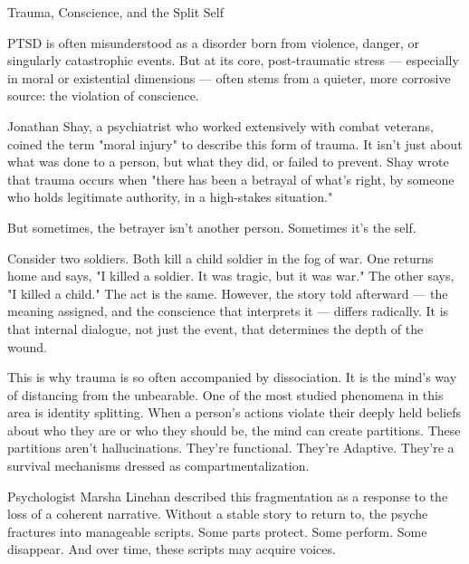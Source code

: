 \medskip

\begin{PsychologicalSidebar}{Trauma, Conscience, and the Split Self}

PTSD is often misunderstood as a disorder born from violence, danger, or singularly catastrophic 
events. But at its core, post-traumatic stress --- especially in moral or existential dimensions --- 
often stems from a quieter, more corrosive source: the violation of conscience.

\medskip

Jonathan Shay, a psychiatrist who worked extensively with combat veterans, coined the term 
"moral injury" to describe this form of trauma. It isn’t just about what was done to a person, but what 
they did, or failed to prevent. Shay wrote that trauma occurs when "there has been a betrayal of 
what’s right, by someone who holds legitimate authority, in a high-stakes situation."

\medskip


But sometimes, the betrayer isn’t another person. Sometimes it’s the self.

\medskip


Consider two soldiers. Both kill a child soldier in the fog of war. One returns home and says, "I 
killed a soldier. It was tragic, but it was war." The other says, "I killed a child." The act is the same. 
However, the story told afterward --- the meaning assigned, and the conscience that interprets it
--- differs radically. It is that internal dialogue, not just the event, that determines the depth 
of the wound.

\medskip


This is why trauma is so often accompanied by dissociation. It is the mind’s way of distancing from the 
unbearable. One of the most studied phenomena in this area is identity splitting. When a person's actions 
violate their deeply held beliefs about who they are or who they should be, the mind can create 
partitions. These partitions aren’t hallucinations. They’re functional. They're Adaptive. 
They're a survival mechanisms dressed as compartmentalization.

\medskip


Psychologist Marsha Linehan described this fragmentation as a response to the loss of a coherent 
narrative. Without a stable story to return to, the psyche fractures into manageable scripts. Some 
parts protect. Some perform. Some disappear. And over time, these scripts may acquire voices.


\end{PsychologicalSidebar}
